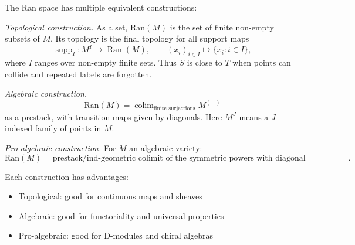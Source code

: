 \begin{construction}
The Ran space has multiple equivalent constructions:

\emph{Topological construction.}
As a set, $\text{Ran}(M)$ is the set of finite non-empty subsets of
$M$. Its topology is the final topology for all support maps
\[
\operatorname{supp}_I\colon M^I\longrightarrow \operatorname{Ran}(M),
\qquad
(x_i)_{i\in I}\longmapsto \{x_i:i\in I\},
\]
where $I$ ranges over non-empty finite sets. Thus $S$ is close to $T$
when points can collide and repeated labels are forgotten.

\emph{Algebraic construction.}
\[\text{Ran}(M) = \mathop{\mathrm{colim}}_{\text{finite surjections}} M^{(-)}\]
as a prestack, with transition maps given by diagonals. Here $M^J$
means a $J$-indexed family of points in $M$.

\emph{Pro-algebraic construction.}
For $M$ an algebraic variety:
\[
\text{Ran}(M)
=
\text{prestack/ind-geometric colimit of the symmetric powers with
diagonal identifications}.
\]

Each construction has advantages:
\begin{itemize}
\item Topological: good for continuous maps and sheaves
\item Algebraic: good for functoriality and universal properties
\item Pro-algebraic: good for D-modules and chiral algebras
\end{itemize}
\end{construction}

